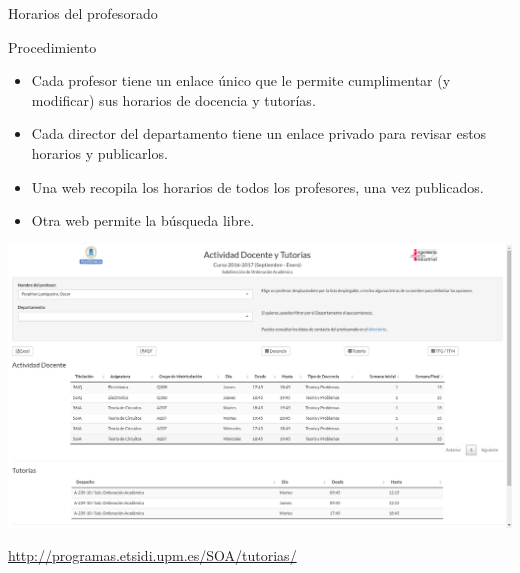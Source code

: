 \documentclass[spanish, xcolor={usenames,svgnames,dvipsnames}]{beamer}
\begin{document}
\begin{frame}[label={sec:org5545fb0}]{Horarios del profesorado}
\begin{block}{Procedimiento}
\begin{itemize}
\item Cada profesor tiene un enlace único que le permite cumplimentar (y modificar) sus horarios de docencia y tutorías.
\item Cada director del departamento tiene un enlace privado para revisar estos horarios y publicarlos.
\item Una web recopila los horarios de todos los profesores, una vez publicados.
\item Otra web permite la búsqueda libre.
\end{itemize}
\end{block}
\end{frame}
\begin{frame}[label={sec:org79c570a}]{}
\begin{center}
\includegraphics[width=.9\linewidth]{images/tutorias.png}
\end{center}

\url{http://programas.etsidi.upm.es/SOA/tutorias/}
\end{frame}
\end{document}
